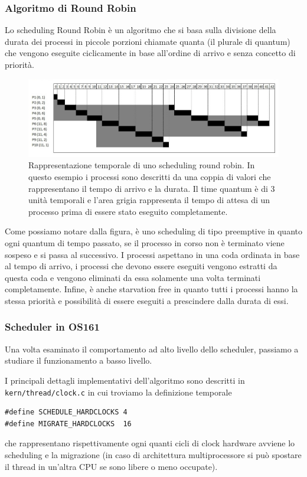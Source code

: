\subsubsection{Algoritmo di Round Robin}
Lo scheduling Round Robin è un algoritmo che si basa sulla divisione della durata dei processi in piccole porzioni chiamate quanta (il plurale di quantum) che vengono eseguite ciclicamente in base all'ordine di arrivo e senza concetto di priorità.
\begin{figure}[hbt!]
    \centering
    \includegraphics[width=\textwidth]{Algoritmi di Scheduling/images/round_robin.jpg}
    \caption{Rappresentazione temporale di uno scheduling round robin. In questo esempio i processi sono descritti da una coppia di valori che rappresentano il tempo di arrivo e la durata. Il time quantum è di 3 unità temporali e l'area grigia rappresenta il tempo di attesa di un processo prima di essere stato eseguito completamente.}
    \label{round_robin}
\end{figure}

Come possiamo notare dalla figura, è uno scheduling di tipo preemptive in quanto ogni quantum di tempo passato, se il processo in corso non è terminato viene sospeso e si passa al successivo. I processi aspettano in una coda ordinata in base al tempo di arrivo, i processi che devono essere eseguiti vengono estratti da questa coda e vengono eliminati da essa solamente una volta terminati completamente. Infine, è anche starvation free in quanto tutti i processi hanno la stessa priorità e possibilità di essere eseguiti a prescindere dalla durata di essi.

\subsubsection{Scheduler in OS161}
Una volta esaminato il comportamento ad alto livello dello scheduler, passiamo a studiare il funzionamento a basso livello.

I principali dettagli implementativi dell'algoritmo sono descritti in \lstinline{kern/thread/clock.c} in cui troviamo la definizione temporale
\begin{lstlisting}[caption={Vincoli temporali in \lstinline{clock.c}}]
#define SCHEDULE_HARDCLOCKS	4
#define MIGRATE_HARDCLOCKS	16
\end{lstlisting}
che rappresentano rispettivamente ogni quanti cicli di clock hardware avviene lo scheduling e la migrazione (in caso di architettura multiprocessore si può spostare il thread in un'altra CPU se sono libere o meno occupate).

